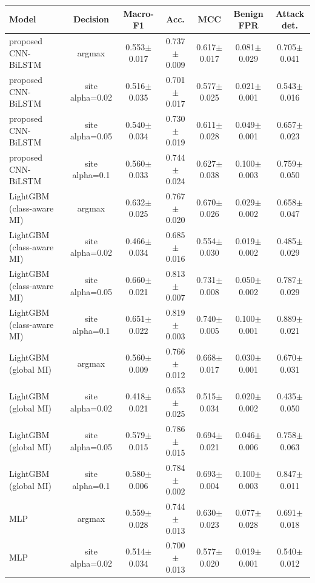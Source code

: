 \begin{tabular}{lcccccc}
\toprule
Model & Decision & Macro-F1 & Acc. & MCC & Benign FPR & Attack det. \\
\midrule
proposed CNN-BiLSTM & argmax & 0.553$\pm$0.017 & 0.737$\pm$0.009 & 0.617$\pm$0.017 & 0.081$\pm$0.029 & 0.705$\pm$0.041 \\
proposed CNN-BiLSTM & site alpha=0.02 & 0.516$\pm$0.035 & 0.701$\pm$0.017 & 0.577$\pm$0.025 & 0.021$\pm$0.001 & 0.543$\pm$0.016 \\
proposed CNN-BiLSTM & site alpha=0.05 & 0.540$\pm$0.034 & 0.730$\pm$0.019 & 0.611$\pm$0.028 & 0.049$\pm$0.001 & 0.657$\pm$0.023 \\
proposed CNN-BiLSTM & site alpha=0.1 & 0.560$\pm$0.033 & 0.744$\pm$0.024 & 0.627$\pm$0.038 & 0.100$\pm$0.003 & 0.759$\pm$0.050 \\
LightGBM (class-aware MI) & argmax & 0.632$\pm$0.025 & 0.767$\pm$0.020 & 0.670$\pm$0.026 & 0.029$\pm$0.002 & 0.658$\pm$0.047 \\
LightGBM (class-aware MI) & site alpha=0.02 & 0.466$\pm$0.034 & 0.685$\pm$0.016 & 0.554$\pm$0.030 & 0.019$\pm$0.002 & 0.485$\pm$0.029 \\
LightGBM (class-aware MI) & site alpha=0.05 & 0.660$\pm$0.021 & 0.813$\pm$0.007 & 0.731$\pm$0.008 & 0.050$\pm$0.002 & 0.787$\pm$0.029 \\
LightGBM (class-aware MI) & site alpha=0.1 & 0.651$\pm$0.022 & 0.819$\pm$0.003 & 0.740$\pm$0.005 & 0.100$\pm$0.001 & 0.889$\pm$0.021 \\
LightGBM (global MI) & argmax & 0.560$\pm$0.009 & 0.766$\pm$0.012 & 0.668$\pm$0.017 & 0.030$\pm$0.001 & 0.670$\pm$0.031 \\
LightGBM (global MI) & site alpha=0.02 & 0.418$\pm$0.021 & 0.653$\pm$0.025 & 0.515$\pm$0.034 & 0.020$\pm$0.002 & 0.435$\pm$0.050 \\
LightGBM (global MI) & site alpha=0.05 & 0.579$\pm$0.015 & 0.786$\pm$0.015 & 0.694$\pm$0.021 & 0.046$\pm$0.006 & 0.758$\pm$0.063 \\
LightGBM (global MI) & site alpha=0.1 & 0.580$\pm$0.006 & 0.784$\pm$0.002 & 0.693$\pm$0.004 & 0.100$\pm$0.003 & 0.847$\pm$0.011 \\
MLP & argmax & 0.559$\pm$0.028 & 0.744$\pm$0.013 & 0.630$\pm$0.023 & 0.077$\pm$0.028 & 0.691$\pm$0.018 \\
MLP & site alpha=0.02 & 0.514$\pm$0.034 & 0.700$\pm$0.013 & 0.577$\pm$0.020 & 0.019$\pm$0.001 & 0.540$\pm$0.012 \\

\end{tabular}
